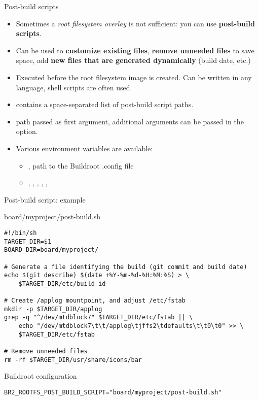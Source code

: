 \begin{frame}{Post-build scripts}
  \begin{itemize}
  \item Sometimes a {\em root filesystem overlay} is not sufficient:
    you can use {\bf post-build scripts}.
  \item Can be used to {\bf customize existing files}, {\bf remove
      unneeded files} to save space, add {\bf new files that are
      generated dynamically} (build date, etc.)
  \item Executed before the root filesystem image is created. Can be
    written in any language, shell scripts are often used.
  \item {} contains a space-separated
    list of post-build script paths.
  \item {} path passed as first argument, additional
    arguments can be passed in the 
    option.
  \item Various environment variables are available:
    \begin{itemize}
      \item {}, path to the Buildroot .config file
      \item {}, , ,
        , , 
      \end{itemize}
  \end{itemize}
\end{frame}

\begin{frame}[fragile]{Post-build script: example}

\begin{block}{board/myproject/post-build.sh}
\begin{verbatim}
#!/bin/sh
TARGET_DIR=$1
BOARD_DIR=board/myproject/

# Generate a file identifying the build (git commit and build date)
echo $(git describe) $(date +%Y-%m-%d-%H:%M:%S) > \
    $TARGET_DIR/etc/build-id

# Create /applog mountpoint, and adjust /etc/fstab
mkdir -p $TARGET_DIR/applog
grep -q "^/dev/mtdblock7" $TARGET_DIR/etc/fstab || \
    echo "/dev/mtdblock7\t\t/applog\tjffs2\tdefaults\t\t0\t0" >> \
    $TARGET_DIR/etc/fstab

# Remove unneeded files
rm -rf $TARGET_DIR/usr/share/icons/bar
\end{verbatim}
\end{block}

\begin{block}{Buildroot configuration}
{\scriptsize
\begin{verbatim}
BR2_ROOTFS_POST_BUILD_SCRIPT="board/myproject/post-build.sh"
\end{verbatim}}
\end{block}

\end{frame}

